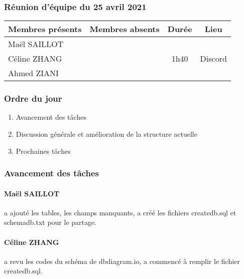 


% 
\subsubsection*{\large{Réunion d'équipe du 25 avril 2021}}
\begin{center}
\begin{tabular}{| l | l || c | c |}
    \hline
    Membres présents & Membres absents & Durée & Lieu \\
    \hline
    Maël SAILLOT & & & \\ Céline ZHANG & & 1h40 & Discord \\ Ahmed ZIANI & & & \\
    \hline
\end{tabular}
\end{center}

\subsubsection*{Ordre du jour}
\begin{enumerate}
    \item Avancement des tâches
    \item Discussion générale et amélioration de la structure actuelle
    \item Prochaines tâches
\end{enumerate}

\subsubsection*{Avancement des tâches}
\paragraph{Maël SAILLOT} a ajouté les tables, les champs manquants, a créé les fichiers \textsf{createdb.sql} et \textsf{schemadb.txt} pour le partage.
\paragraph{Céline ZHANG} a revu les codes du schéma de \textsf{dbdiagram.io}, a commencé à remplir le fichier \textsf{createdb.sql}.
